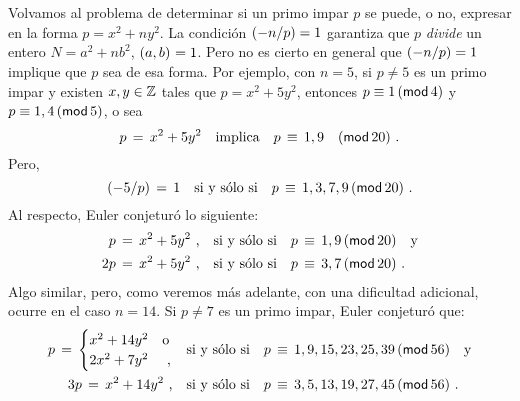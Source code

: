 \theoremstyle{plain}

\theoremstyle{definition}


Volvamos al problema de determinar si un primo impar $p$ se puede,
o no, expresar en la forma $p=x^2+ny^2$.
La condici\'on $\tlegendre{-n} p=1$ garantiza que $p$ \emph{divide}
un entero $N=a^2+nb^2$, $\mcd{a,b}=1$.
Pero no es cierto en general que $\tlegendre{-n} p=1$ implique que
$p$ sea de esa forma. Por ejemplo, con $n=5$, si $p\neq 5$ es un
primo impar y existen $x,y\in\Enteros$ tales que $p=x^2+5y^2$,
entonces $p\equiv 1\tmodulo[4]$ y $p\equiv 1,4\tmodulo[5]$, o sea
\begin{displaymath}
	p\,=\,x^2+5y^2\quad\text{implica}\quad
		p\,\equiv\, 1,9\modulo[20]
	\text{ .}
\end{displaymath}
%
Pero,
\begin{displaymath}
	\tlegendre{-5} p\,=\,1\quad\text{si y s\'olo si}\quad
		p\,\equiv\,1,3,7,9\tmodulo[20]
	\text{ .}
\end{displaymath}
%
Al respecto, Euler conjetur\'o lo siguiente:
\begin{displaymath}
	\begin{aligned}
		p\,=\,x^2+5y^2\text{ ,} &
			\quad\text{si y s\'olo si}\quad
		p\,\equiv\,1,9\tmodulo[20]\quad\text{y} \\
		2p\,=\,x^2+5y^2\text{ ,} &
			\quad\text{si y s\'olo si}\quad
		p\,\equiv\,3,7\tmodulo[20]
		\text{ .}
	\end{aligned}
\end{displaymath}
%
Algo similar, pero, como veremos m\'as adelante, con una
dificultad adicional, ocurre en el caso $n=14$. Si $p\neq 7$
es un primo impar, Euler conjetur\'o que:
\begin{displaymath}
	\begin{aligned}
		p\,=\,	\begin{cases}
				x^2+14y^2 & \text{o} \\
				2x^2+7y^2 & \text{ ,}
			\end{cases}
			& \quad\text{si y s\'olo si}\quad
		p\,\equiv\,1,9,15,23,25,39\tmodulo[56]
			\quad\text{y} \\
		3p\,=\,x^2+14y^2\text{ ,}
			& \quad\text{si y s\'olo si}\quad
		p\,\equiv\,3,5,13,19,27,45\tmodulo[56]
		\text{ .}
	\end{aligned}
\end{displaymath}
